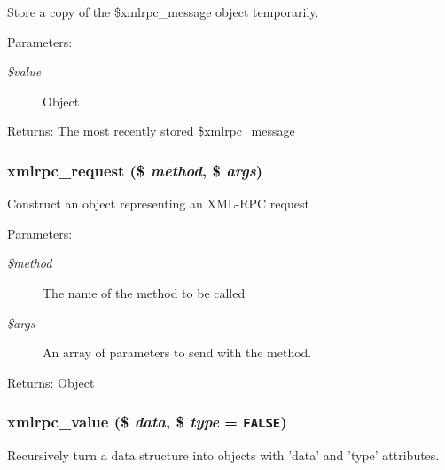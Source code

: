 Store a copy of the \$xmlrpc\_\-message object temporarily.

\begin{Desc}
\item[Parameters:]
\begin{description}
\item[{\em \$value}]Object \end{description}
\end{Desc}
\begin{Desc}
\item[Returns:]The most recently stored \$xmlrpc\_\-message \end{Desc}
\hypertarget{xmlrpc_8inc_21b3f792f935fd99fc444c82493aaca9}{
\subsubsection[{xmlrpc\_\-request}]{\setlength{\rightskip}{0pt plus 5cm}xmlrpc\_\-request (\$ {\em method}, \/  \$ {\em args})}}
\label{xmlrpc_8inc_21b3f792f935fd99fc444c82493aaca9}


Construct an object representing an XML-RPC request

\begin{Desc}
\item[Parameters:]
\begin{description}
\item[{\em \$method}]The name of the method to be called \item[{\em \$args}]An array of parameters to send with the method. \end{description}
\end{Desc}
\begin{Desc}
\item[Returns:]Object \end{Desc}
\hypertarget{xmlrpc_8inc_f88c4a9120094b9280ddc4d90bc51987}{
\subsubsection[{xmlrpc\_\-value}]{\setlength{\rightskip}{0pt plus 5cm}xmlrpc\_\-value (\$ {\em data}, \/  \$ {\em type} = {\tt FALSE})}}
\label{xmlrpc_8inc_f88c4a9120094b9280ddc4d90bc51987}


Recursively turn a data structure into objects with 'data' and 'type' attributes.


